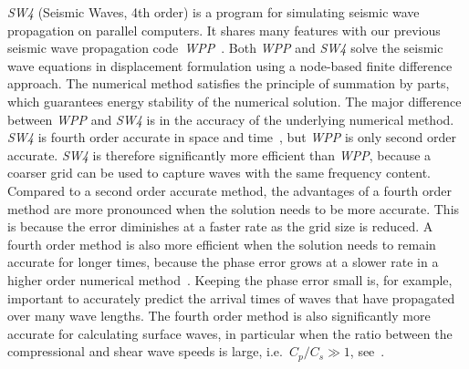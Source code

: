 \documentclass[11pt]{report}
\begin{document}
\emph{SW4} (Seismic Waves, 4th order) is a program for simulating seismic wave propagation on
parallel computers. It shares many features with our previous seismic wave propagation
code~\emph{WPP}~\cite{WPP2}. Both \emph{WPP} and \emph{SW4} solve the seismic wave equations in
displacement formulation using a node-based finite difference approach. The numerical method
satisfies the principle of summation by parts, which guarantees energy stability of the numerical
solution. The major difference between \emph{WPP} and \emph{SW4} is in the accuracy of the
underlying numerical method. \emph{SW4} is fourth order accurate in space and time~\cite{SjoPet-12},
but \emph{WPP} is only second order accurate. \emph{SW4} is therefore significantly more efficient
than \emph{WPP}, because a coarser grid can be used to capture waves with the same frequency
content. Compared to a second order accurate method, the advantages of a fourth order method are
more pronounced when the solution needs to be more accurate. This is because the error diminishes at
a faster rate as the grid size is reduced. A fourth order method is also more efficient when the
solution needs to remain accurate for longer times, because the phase error grows at a slower rate
in a higher order numerical method~\cite{Gustafsson-Kreiss-Oliger}. Keeping the phase error small
is, for example, important to accurately predict the arrival times of waves that have propagated
over many wave lengths. The fourth order method is also significantly more accurate for calculating
surface waves, in particular when the ratio between the compressional and shear wave speeds is
large, i.e.~$C_p/C_s\gg 1$, see~\cite{KrePet-12}.

\end{document}

